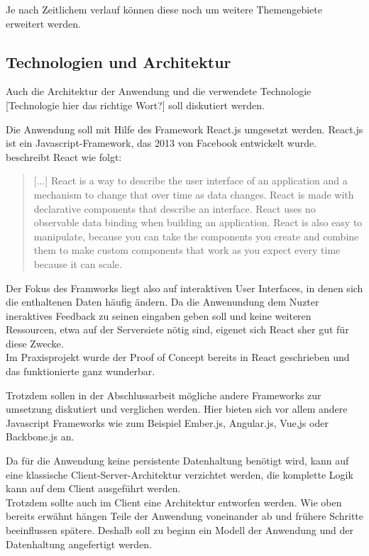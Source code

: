 Je nach Zeitlichem verlauf können diese noch um weitere Themengebiete erweitert werden.

\subsection{Technologien und Architektur}
Auch die Architektur der Anwendung und die verwendete Technologie [Technologie hier das richtige Wort?] soll diskutiert werden.

Die Anwendung soll mit Hilfe des Framework React.js umgesetzt werden. React.js ist ein Javascript-Framework, das 2013 von Facebook entwickelt wurde. \cite{gackenheimer2015react} beschreibt React wie folgt:

\begin{quote}
[...] React is a way to describe the user interface of an application and a mechanism to change that over time as data changes. React is made with declarative components that describe an interface. React uses no observable data binding when building an application. React is also easy to manipulate, because you can take the components you create and combine them to make custom components that work as you expect every time because it can scale.
\end{quote}

Der Fokus des Framworks liegt also auf interaktiven User Interfaces, in denen sich die enthaltenen Daten häufig ändern. Da die Anwenundung dem Nuzter ineraktives Feedback zu seinen eingaben geben soll und keine weiteren Ressourcen, etwa auf der Serversiete nötig sind, eigenet sich React sher gut für diese Zwecke. \\
Im Praxisprojekt wurde der Proof of Concept bereits in React geschrieben und das funktionierte ganz wunderbar.

Trotzdem sollen in der Abschlussarbeit mögliche andere Frameworks zur umsetzung diskutiert und verglichen werden. Hier bieten sich vor allem andere Javascript Frameworks wie zum Beispiel Ember.js, Angular.js, Vue,js oder Backbone.js an.

Da für die Anwendung keine persistente Datenhaltung benötigt wird, kann auf eine klassische Client-Server-Architektur verzichtet werden, die komplette Logik kann auf dem Client ausgeführt werden.\\
Trotzdem sollte auch im Client eine Architektur entworfen werden. Wie oben bereits erwähnt hängen Teile der Anwendung voneinander ab und frühere Schritte beeinflussen spätere. Deshalb soll zu beginn ein Modell der Anwendung und der Datenhaltung angefertigt werden.

